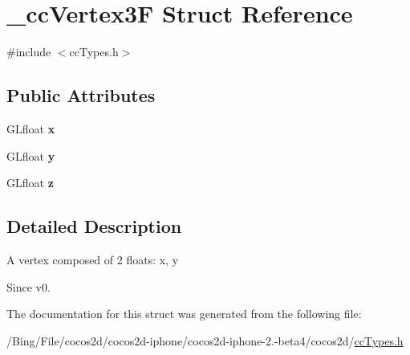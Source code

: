 \hypertarget{struct__cc_vertex3_f}{\section{\-\_\-cc\-Vertex3\-F Struct Reference}
\label{struct__cc_vertex3_f}
}


{\ttfamily \#include $<$cc\-Types.\-h$>$}

\subsection*{Public Attributes}
\begin{DoxyCompactItemize}
\item 
\hypertarget{struct__cc_vertex3_f_a198fa0634e97bcce2fcbf479c6ef4aeb}{G\-Lfloat {\bfseries x}}\label{struct__cc_vertex3_f_a198fa0634e97bcce2fcbf479c6ef4aeb}

\item 
\hypertarget{struct__cc_vertex3_f_a90f846c0ac28ba11c0b158c145c77ceb}{G\-Lfloat {\bfseries y}}\label{struct__cc_vertex3_f_a90f846c0ac28ba11c0b158c145c77ceb}

\item 
\hypertarget{struct__cc_vertex3_f_a00f941832e3ad04d0ad1d85f179aa154}{G\-Lfloat {\bfseries z}}\label{struct__cc_vertex3_f_a00f941832e3ad04d0ad1d85f179aa154}

\end{DoxyCompactItemize}


\subsection{Detailed Description}
A vertex composed of 2 floats\-: x, y \begin{DoxySince}{Since}
v0. 
\end{DoxySince}


The documentation for this struct was generated from the following file\-:\begin{DoxyCompactItemize}
\item 
/\-Bing/\-File/cocos2d/cocos2d-\/iphone/cocos2d-\/iphone-\/2.-\/beta4/cocos2d/\hyperlink{cc_types_8h}{cc\-Types.\-h}\end{DoxyCompactItemize}

